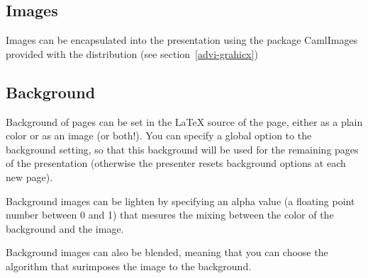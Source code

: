 \documentclass[12pt]{article}
\begin{document}
\subsection {Images}

Images can be encapsulated into the presentation using the package
CamlImages provided with the distribution
(see section~\ref {advi-grahicx})

\subsection {Background}

Background of pages can be set in the {\LaTeX} source of the page,
either as a plain color or as an image (or both!).
You can specify a global option to the background setting, so that this
background will be used for the remaining pages of the presentation
(otherwise the presenter resets background options at each new page).

Background images can be lighten by specifying an alpha value (a
floating point number between 0 and 1) that mesures the mixing
between the color of the background and the image.

Background images can also be blended, meaning that you can choose the
algorithm that surimposes the image to the background.
\end{document}

